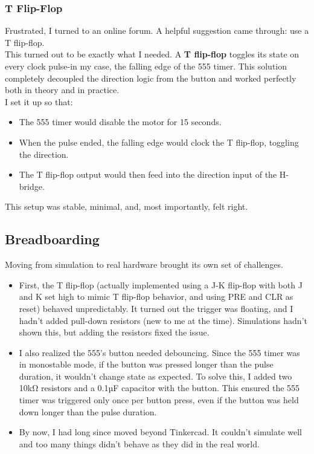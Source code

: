 \documentclass{article}
\begin{document}
\subsubsection{T Flip-Flop}
Frustrated, I turned to an online forum. A helpful suggestion came through: {use a T flip-flop.}\\
This turned out to be exactly what I needed. A \textbf{T flip-flop} toggles its state on every clock pulse-in my case, the falling edge of the 555 timer. This solution completely decoupled the direction logic from the button and worked perfectly both in theory and in practice.\\[3pt]
I set it up so that:
\begin{itemize}[itemsep=-1mm]
	\item The {555 timer} would disable the motor for 15 seconds.
	\item When the pulse ended, the falling edge would clock the {T flip-flop}, toggling the direction.
	\item The T flip-flop output would then feed into the direction input of the H-bridge.
\end{itemize}
This setup was stable, minimal, and, most importantly, felt right.

\subsection{Breadboarding}
Moving from simulation to real hardware brought its own set of challenges.
\begin{itemize}[itemsep=-1mm]
	\item First, the {T flip-flop} (actually implemented using a J-K flip-flop with both J and K set high to mimic T flip-flop behavior, and using {PRE} and {CLR} as reset) behaved unpredictably. It turned out the trigger was {floating}, and I hadn’t added pull-down resistors (new to me at the time). Simulations hadn’t shown this, but adding the resistors fixed the issue.
	\item I also realized the 555’s button needed debouncing. Since the 555 timer was in monostable mode, if the button was pressed longer than the pulse duration, it wouldn’t change state as expected. To solve this, I added two 10kΩ resistors and a 0.1µF capacitor with the button. This ensured the 555 timer was triggered only once per button press, even if the button was held down longer than the pulse duration.
	\item By now, I had long since moved beyond Tinkercad. It couldn’t simulate well and too many things didn’t behave as they did in the real world.
\end{itemize}
\end{document}
